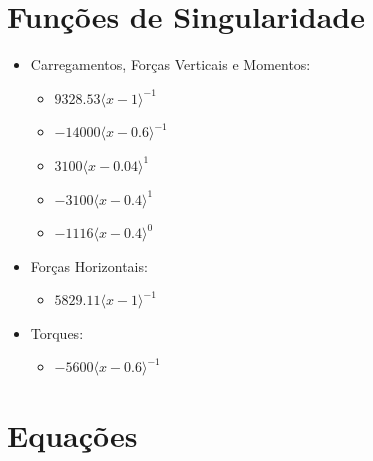 \documentclass[10pt]{article}
\begin{document}
\section*{Funções de Singularidade}
\begin{itemize}
\item Carregamentos, Forças Verticais e Momentos:
\begin{itemize}
\item \( 9328.53{\langle x-1 \rangle}^{-1} \) 
\item \( -14000{\langle x-0.6 \rangle}^{-1} \) 
\item \( 3100{\langle x-0.04 \rangle}^{1} \) 
\item \( -3100{\langle x-0.4 \rangle}^{1} \) 
\item \( -1116{\langle x-0.4 \rangle}^{0} \) 
\end{itemize}
\item Forças Horizontais:
\begin{itemize}
\item \( 5829.11{\langle x-1 \rangle}^{-1} \) 
\end{itemize}
\item Torques:
\begin{itemize}
\item \( -5600{\langle x-0.6 \rangle}^{-1} \) 
\end{itemize}
\end{itemize}
\section*{Equações}
\end{document}
